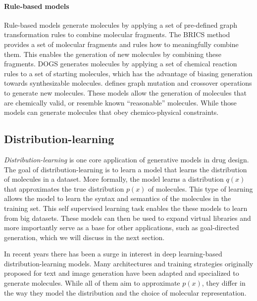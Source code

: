\paragraph{Rule-based models}
Rule-based models generate molecules by applying a set of pre-defined graph transformation rules to
combine molecular fragments. The BRICS \citep{degenArtCompilingUsing2008} method provides a set of
molecular fragments and rules how to meaningfully combine them. This enables the generation of new
molecules by combining these fragments. DOGS \citep{hartenfellerDOGSReactionDrivenNovo2012}
generates molecules by applying a set of chemical reaction rules to a set of starting molecules,
which has the advantage of biasing generation towards synthesizable molecules.\@
\citet{jensenGraphbasedGeneticAlgorithm2019} defines graph mutation and crossover operations to
generate new molecules. These models allow the generation of molecules that are chemically valid, or
resemble known ``reasonable'' molecules. While those models can generate molecules that obey
chemico-physical constraints.


\subsection{Distribution-learning}
\emph{Distribution-learning} is one core application of generative models in drug design. The goal
of distribution-learning is to learn a model that learns the distribution of molecules in a dataset.
More formally, the model learns a distribution $q(x)$ that approximates the true distribution $p(x)$
of molecules. This type of learning allows the model to learn the syntax and semantics of the
molecules in the training set. This self supervised learning task enables the these models to learn
from big datasets. These models can then be used to expand virtual libraries and more importantly
serve as a base for other applications, such as goal-directed generation, which we will discuss in
the next section.

In recent years there has been a surge in interest in deep learning-based distribution-learning
models. Many architectures and training strategies originally proposed for text and image generation
have been adapted and specialized to generate molecules. While all of them aim to approximate
$p(x)$, they differ in the way they model the distribution and the choice of molecular
representation.

